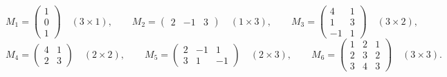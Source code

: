 \documentclass{article}
\begin{document}
  
  
  
%   
%   

  
  
  
%  
  
  
  
  
  
  
  
  
  

\[
M_1 = \begin{pmatrix} 1 \\ 0 \\ 1 \end{pmatrix} \quad (3 \times 1), \qquad
M_2 = \begin{pmatrix} 2 & -1 & 3 \end{pmatrix} \quad (1 \times 3), \qquad
M_3 = \begin{pmatrix} 4 & 1 \\ 1 & 3 \\ -1 & 1 \end{pmatrix} \quad (3 \times 2),
\]
\[
M_4 = \begin{pmatrix} 4 & 1 \\ 2 & 3 \end{pmatrix} \quad (2 \times 2), \qquad
M_5 = \begin{pmatrix} 2 & -1 & 1 \\ 3 & 1 & -1 \end{pmatrix} \quad (2 \times 3), \qquad
M_6 = \begin{pmatrix} 1 & 2 & 1 \\ 2 & 3 & 2 \\ 3 & 4 & 3 \end{pmatrix} \quad (3 \times 3).
\]
\end{document}
